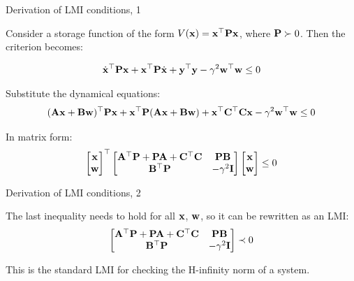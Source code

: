 \documentclass{beamer}
\begin{document}
	
	\begin{frame}{Derivation of LMI conditions, 1}
		\begin{flushleft}
			
			Consider a storage function of the form $V( \mathbf{x}) =  \mathbf{x}^\top  \mathbf{P}  \mathbf{x}$, where $ \mathbf{P} \succ 0$. Then the criterion becomes:
			
			\begin{align}
				\dot{\mathbf{x}}^\top  \mathbf{P}  \mathbf{x} + \mathbf{x}^\top  \mathbf{P}  \dot{\mathbf{x}} + \mathbf{y}^\top \mathbf{y} - \gamma^2 \mathbf{w}^\top \mathbf{w} \leq 0
			\end{align}
			
			Substitute the dynamical equations:
			\begin{align*}
				(\mathbf{A}\mathbf{x}+\mathbf{B}\mathbf{w})^\top  \mathbf{P}  \mathbf{x} + \mathbf{x}^\top  \mathbf{P} (\mathbf{A}\mathbf{x}+\mathbf{B}\mathbf{w}) + \mathbf{x}^\top  \mathbf{C}^\top \mathbf{C}\mathbf{x} - \gamma^2 \mathbf{w}^\top \mathbf{w} \leq 0
			\end{align*}
			
			In matrix form:
			\begin{align}
				\begin{bmatrix}
					\mathbf{x} \\ \mathbf{w}
				\end{bmatrix}^\top
				\begin{bmatrix}
					\mathbf{A}^\top\mathbf{P}+\mathbf{P}\mathbf{A}+\mathbf{C}^\top\mathbf{C} & \mathbf{P}\mathbf{B} \\
					 \mathbf{B}^\top\mathbf{P}  & -\gamma^2 \mathbf{I}
				\end{bmatrix}
				\begin{bmatrix}
					\mathbf{x} \\ \mathbf{w}
				\end{bmatrix}
				\leq 0
			\end{align}
			
			
			
		\end{flushleft}
	\end{frame}
	
	
	
	
	\begin{frame}{Derivation of LMI conditions, 2}
		\begin{flushleft}
			
			The last inequality needs to hold for all $\mathbf{x}$, $\mathbf{w}$, so it can be rewritten as an LMI:
			\begin{align}
				\begin{bmatrix}
					\mathbf{A}^\top\mathbf{P}+\mathbf{P}\mathbf{A}+\mathbf{C}^\top\mathbf{C} & \mathbf{P}\mathbf{B} \\
					\mathbf{B}^\top\mathbf{P}  & -\gamma^2 \mathbf{I}
				\end{bmatrix}
				\prec 0
			\end{align}
			
			This is the standard LMI for checking the H-infinity norm of a system.
			
		\end{flushleft}
	\end{frame}
	
\end{document}
